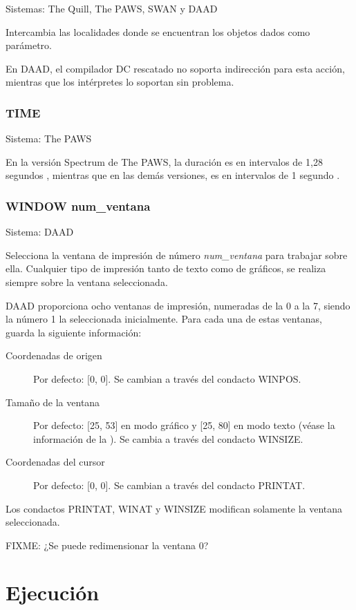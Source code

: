 \documentclass[11pt, a5paper]{article}
\newcommand{\quill}{\textsf{The Quill}\xspace}
\newcommand{\paw}{\textsf{The PAWS}\xspace}
\newcommand{\swan}{\textsf{SWAN}\xspace}
\newcommand{\daad}{\textsf{DAAD}\xspace}
\newcommand{\sistema}[1]{\noindent Sistema: #1 \nopagebreak}
\newcommand{\sistemas}[1]{\noindent Sistemas: #1 \nopagebreak}
\begin{document}
\sistemas{\quill, \paw, \swan y \daad}

Intercambia las localidades donde se encuentran los objetos dados como parámetro.

En \daad, el compilador DC rescatado no soporta indirección para esta acción, mientras que los intérpretes lo soportan sin problema.

\subsubsection{TIME}

\sistema{\paw}

En la versión Spectrum de \paw, la duración es en intervalos de 1,28 segundos \cite{PawsZX}, mientras que en las demás versiones, es en intervalos de 1 segundo \cite{PawsPC}.

\subsubsection{WINDOW num\_ventana}

\sistema{\daad}

Selecciona la ventana de impresión de número \emph{num\_ventana} para trabajar sobre ella. Cualquier tipo de impresión tanto de texto como de gráficos, se realiza siempre sobre la ventana seleccionada.

\daad proporciona ocho ventanas de impresión, numeradas de la 0 a la 7, siendo la número 1 la seleccionada inicialmente. Para cada una de estas ventanas, guarda la siguiente información:

\begin{description}
  \item[Coordenadas de origen] Por defecto: [0, 0]. Se cambian a través del condacto WINPOS.

  \item[Tamaño de la ventana] Por defecto: [25, 53] en modo gráfico y [25, 80] en modo texto (véase la información de la ). Se cambia a través del condacto WINSIZE.

  \item[Coordenadas del cursor] Por defecto: [0, 0]. Se cambian a través del condacto PRINTAT.
\end{description}

Los condactos PRINTAT, WINAT y WINSIZE modifican solamente la ventana seleccionada.

FIXME: ¿Se puede redimensionar la ventana 0?


\section{Ejecución}
\end{document}
